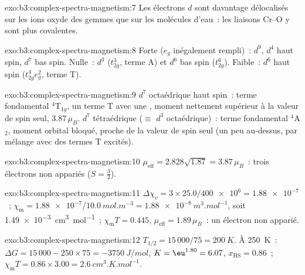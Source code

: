 \begin{solution}{exo:b3:complex-spectra-magnetism:7}
Les électrons $d$ sont davantage délocalisés sur les ions oxyde des gemmes
que sur les molécules d'eau~: les liaisons Cr--O y sont plus covalentes.
\end{solution}

\begin{solution}{exo:b3:complex-spectra-magnetism:8}
Forte ($e_g$ inégalement rempli)~: $d^9$, $d^4$ haut spin, $d^7$ bas spin. Nulle~: $d^3$ ($t_{2g}^3$, terme A) et
$d^6$ bas spin ($t_{2g}^6$). Faible~: $d^6$ haut spin ($t_{2g}^4e_g^2$, terme T).
\end{solution}

\begin{solution}{exo:b3:complex-spectra-magnetism:9}
$d^7$ octaédrique haut spin~: terme fondamental $^4$T$_{1g}$, un terme T avec une ,
moment nettement supérieur à la valeur de spin seul, $3.87\,\mu_B$. $d^7$ tétraédrique ($\equiv$ $d^3$ octaédrique)~: terme
fondamental $^4$A$_2$, moment orbital bloqué, proche de la valeur de spin
seul (un peu au-dessus, par mélange avec des termes T excités).
\end{solution}

\begin{solution}{exo:b3:complex-spectra-magnetism:10}
$\mu_{\mathrm{eff}} = 2.828\sqrt{1.87} = 3.87\,\mu_B$~: trois électrons non appariés ($S = \frac32$).
\end{solution}

\begin{solution}{exo:b3:complex-spectra-magnetism:11}
$\Delta\chi_v = 3 \times 25.0/\num{400e6} = \num{1.88e-7}$~; $\chi_{\mathrm m} = \num{1.88e-7}/\qty{10.0}{mol.m^{-3}} = \qty{1.88e-8}{m^3.mol^{-1}}$, soit
\qty{1.49e-3}{cm^3.mol^{-1}}~; $\chi_{\mathrm m}T = 0.445$, $\mu_{\mathrm{eff}} = 1.89\,\mu_B$~: un électron non apparié.
\end{solution}

\begin{solution}{exo:b3:complex-spectra-magnetism:12}
$T_{1/2} = 15\,000/75 = \qty{200}{K}$. À \qty{250}{K}~: $\Delta G = 15\,000 - 250 \times 75 = \qty{-3750}{J/mol}$, $K = \eu^{1.80} = 6.07$,
$x_{\mathrm{HS}} = 0.86$~; $\chi_{\mathrm m}T = 0.86 \times 3.00 = \qty{2.6}{cm^3.K.mol^{-1}}$.
\end{solution}

